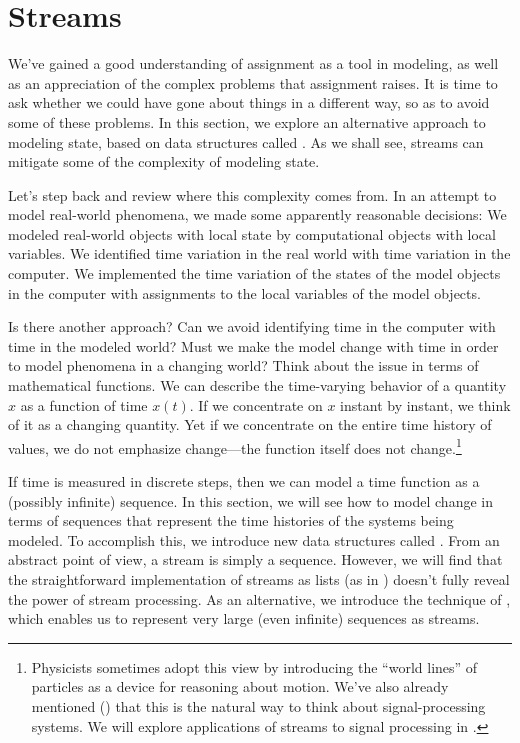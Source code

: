 \section{Streams}
\label{Section 3.5}

We've gained a good understanding of assignment as a tool in modeling, as well
as an appreciation of the complex problems that assignment raises. It is time
to ask whether we could have gone about things in a different way, so as to
avoid some of these problems.  In this section, we explore an alternative
approach to modeling state, based on data structures called .
As we shall see, streams can mitigate some of the complexity of modeling state.

Let's step back and review where this complexity comes from.  In an attempt to
model real-world phenomena, we made some apparently reasonable decisions: We
modeled real-world objects with local state by computational objects with local
variables.  We identified time variation in the real world with time variation
in the computer.  We implemented the time variation of the states of the model
objects in the computer with assignments to the local variables of the model
objects.

Is there another approach?  Can we avoid identifying time in the computer with
time in the modeled world?  Must we make the model change with time in order to
model phenomena in a changing world?  Think about the issue in terms of
mathematical functions.  We can describe the time-varying behavior of a
quantity \( x \) as a function of time \( x(t) \).  If we concentrate on \( x \)
instant by instant, we think of it as a changing quantity.  Yet if we
concentrate on the entire time history of values, we do not emphasize
change---the function itself does not change.\footnote{Physicists sometimes
adopt this view by introducing the ``world lines'' of particles as a device for
reasoning about motion.  We've also already mentioned ()
that this is the natural way to think about signal-processing systems.  We will
explore applications of streams to signal processing in .}

If time is measured in discrete steps, then we can model a time function as a
(possibly infinite) sequence.  In this section, we will see how to model change
in terms of sequences that represent the time histories of the systems being
modeled.  To accomplish this, we introduce new data structures called
.  From an abstract point of view, a stream is simply a
sequence.  However, we will find that the straightforward implementation of
streams as lists (as in ) doesn't fully reveal the power of
stream processing.  As an alternative, we introduce the technique of
, which enables us to represent very large (even
infinite) sequences as streams.

